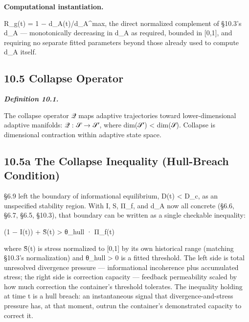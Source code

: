 \documentclass[
]{article}
\begin{document}
\textbf{Computational instantiation.}

R\_g(t) = 1 − d\_A(t)/d\_A\^{}max, the direct normalized complement of
§10.3's d\_A --- monotonically decreasing in d\_A as required, bounded
in {[}0,1{]}, and requiring no separate fitted parameters beyond those
already used to compute d\_A itself.

\hypertarget{collapse-operator}{%
\subsection{10.5 Collapse Operator}\label{collapse-operator}}

\emph{\textbf{Definition 10.1.}}

The collapse operator 𝒬 maps adaptive trajectories toward
lower-dimensional adaptive manifolds: 𝒬 : 𝒮 → 𝒮′, where dim(𝒮′)
\textless{} dim(𝒮). Collapse is dimensional contraction within adaptive
state space.

\hypertarget{a-the-collapse-inequality-hull-breach-condition}{%
\subsection{10.5a The Collapse Inequality (Hull-Breach
Condition)}\label{a-the-collapse-inequality-hull-breach-condition}}

§6.9 left the boundary of informational equilibrium, D(t) \textless{}
D\_c, as an unspecified stability region. With I, S, Π\_f, and d\_A now
all concrete (§6.6, §6.7, §6.5, §10.3), that boundary can be written as
a single checkable inequality:

(1 − I(t)) + S̃(t) \textgreater{} θ\_hull · Π\_f(t)

where S̃(t) is stress normalized to {[}0,1{]} by its own historical range
(matching §10.3's normalization) and θ\_hull \textgreater{} 0 is a
fitted threshold. The left side is total unresolved divergence pressure
--- informational incoherence plus accumulated stress; the right side is
correction capacity --- feedback permeability scaled by how much
correction the container's threshold tolerates. The inequality holding
at time t is a hull breach: an instantaneous signal that
divergence-and-stress pressure has, at that moment, outrun the
container's demonstrated capacity to correct it.
\end{document}
